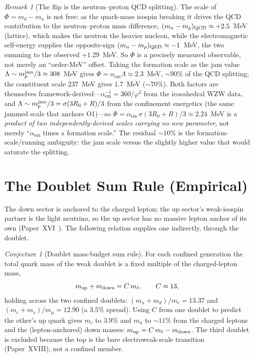 \documentclass[11pt,a4paper]{article}
\theoremstyle{definition}\newtheorem{definition}[theorem]{Definition}
\theoremstyle{remark}
\newtheorem{remark}[theorem]{Remark}
\newtheorem{conjecture}[theorem]{Conjecture}
\newcommand{\vp}{\varphi}
\newcommand{\alphaem}{\alpha_{\mathrm{em}}}
\begin{document}
\begin{remark}[The flip is the neutron--proton QCD splitting]
\label{P20:rem:gen1_np}
The scale of $\Phi=m_d-m_u$ is not free: as the quark-mass isospin breaking it
drives the QCD contribution to the neutron--proton mass difference,
$(m_n-m_p)_{\rm QCD}\approx+2.5$~MeV (lattice), which makes the neutron the heavier
nucleon, while the electromagnetic self-energy supplies the opposite-sign
$(m_n-m_p)_{\rm QED}\approx-1$~MeV, the two summing to the observed $+1.29$~MeV. So
$\Phi$ is a precisely measured observable, not merely an ``order-MeV'' offset. Taking
the formation scale as the jam value $\Lambda\sim m_p^{\rm jam}/3\approx308$~MeV gives
$\Phi=\alphaem\Lambda\approx2.3$~MeV, $\sim90\%$ of the QCD splitting; the constituent
scale $237$~MeV gives $1.7$~MeV ($\sim70\%$). Both factors are themselves
framework-derived---$\alphaem^{-1}=360/\vp^2$ from the icosahedral WZW data, and
$\Lambda\sim m_p^{\rm jam}/3=\sigma(3R_0+R)/3$ from the confinement energetics (the same
jammed scale that anchors O1)---so $\Phi=\alphaem\,\sigma(3R_0+R)/3\approx2.24$~MeV is a
\emph{product of two independently-derived scales carrying no new parameter}, not merely
``$\alphaem$ times a formation scale.'' The residual $\sim10\%$ is the
formation-scale/running ambiguity: the jam scale versus the slightly higher value that
would saturate the splitting.
\end{remark}

\section{The Doublet Sum Rule (Empirical)}
\label{P20:sec:sumrule}

The down sector is anchored to the charged lepton; the up sector's
weak-isospin partner is the light neutrino, so the up sector has no
massive lepton anchor of its own (Paper~XVI~\cite{Paper16}). The
following relation supplies one indirectly, through the doublet.

\begin{conjecture}[Doublet mass-budget sum rule]
\label{P20:conj:sumrule}
For each confined generation the total quark mass of the weak doublet is
a fixed multiple of the charged-lepton mass,
\begin{equation}
  m_{\rm up}+m_{\rm down}=C\,m_\ell,\qquad C\approx13,
  \label{P20:eq:sumrule}
\end{equation}
holding across the two confined doublets:
$(m_u+m_d)/m_e=13.37$ and $(m_c+m_s)/m_\mu=12.90$ (a $3.5\%$ spread).
Using $C$ from one doublet to predict the other's up quark gives $m_c$
to $3.9\%$ and $m_u$ to $\sim11\%$ from the charged leptons and the
(lepton-anchored) down masses: $m_{\rm up}=C\,m_\ell-m_{\rm down}$. The
third doublet is excluded because the top is the bare electroweak-scale
transition (Paper~XVIII), not a confined member.
\end{conjecture}
\end{document}
